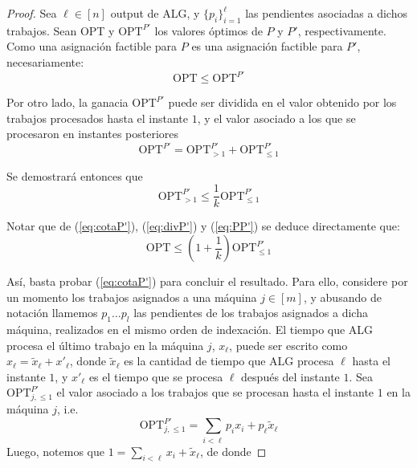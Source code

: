 \documentclass[10pt]{article}
\theoremstyle{plain}
\theoremstyle{definition}
\begin{document}
\begin{proof}
Sea $\ell \in [n]$ output de ALG, y $\{p_i\}_{i=1}^\ell$ las pendientes asociadas a dichos trabajos. Sean OPT y $\text{OPT}^{P'}$ los valores óptimos de $P$ y $P'$, respectivamente. Como una asignación factible para $P$ es una asignación factible para $P'$, necesariamente:
\begin{equation}
\label{eq:PP'}
\text{OPT} \leq \text{OPT}^{P'}
\end{equation}

Por otro lado, la ganacia $\text{OPT}^{P'}$ puede ser dividida en el valor obtenido por los trabajos procesados hasta el instante $1$, y el valor asociado a los que se procesaron en instantes posteriores
\begin{equation}
\label{eq:divP'}
\text{OPT}^{P'} = \text{OPT}^{P'}_{>1} + \text{OPT}^{P'}_{\leq 1}
\end{equation}

Se demostrar\'a entonces que
\begin{equation}
\label{eq:cotaP'}
\text{OPT}^{P'}_{>1} \leq \frac{1}{k}\text{OPT}^{P'}_{\leq 1}
\end{equation}

Notar que de (\ref{eq:cotaP'}), (\ref{eq:divP'}) y (\ref{eq:PP'}) se deduce directamente que:
\begin{equation*}
\text{OPT} \leq \left( 1 + \frac{1}{k} \right)\text{OPT}^{P'}_{\leq 1}
\end{equation*}

Así, basta probar (\ref{eq:cotaP'}) para concluir el resultado. Para ello, considere por un momento los trabajos asignados a una máquina $j \in [m]$, y abusando de notación llamemos $p_1 \ldots p_l$ las pendientes de los trabajos asignados a dicha máquina, realizados en el mismo orden de indexación. El tiempo que ALG procesa el último trabajo en la máquina $j$, $x_\ell$, puede ser escrito como $x_\ell = \tilde{x}_\ell + x'_\ell$, donde $\tilde{x}_\ell$ es la cantidad de tiempo que ALG procesa $\ell$ hasta el instante $1$, y $x'_\ell$ es el tiempo que se procesa $\ell$ después del instante $1$. Sea $\text{OPT}^{P'}_{j,\leq 1}$ el valor asociado a los trabajos que se procesan hasta el instante $1$ en la máquina $j$, i.e.
\begin{equation}
\label{eq:ganjP}
\text{OPT}^{P'}_{j,\leq 1} = \sum_{i <\ell} p_i x_i + p_\ell \tilde{x}_\ell
\end{equation} 
Luego, notemos que $1 = \sum_{i<\ell} x_i + \tilde{x}_{\ell}$, de donde


\end{proof}
\end{document}
